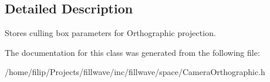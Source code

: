 \subsection{Detailed Description}
Stores culling box parameters for Orthographic projection. 

The documentation for this class was generated from the following file\+:\begin{DoxyCompactItemize}
\item 
/home/filip/\+Projects/fillwave/inc/fillwave/space/Camera\+Orthographic.\+h\end{DoxyCompactItemize}
